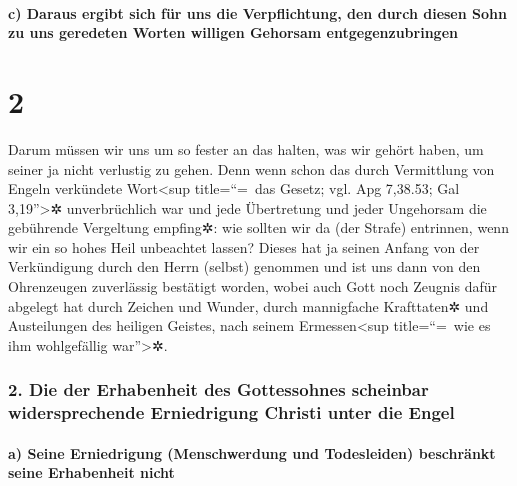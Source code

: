 \hypertarget{c-daraus-ergibt-sich-fuxfcr-uns-die-verpflichtung-den-durch-diesen-sohn-zu-uns-geredeten-worten-willigen-gehorsam-entgegenzubringen}{%
\paragraph{c) Daraus ergibt sich für uns die Verpflichtung, den durch
diesen Sohn zu uns geredeten Worten willigen Gehorsam
entgegenzubringen}\label{c-daraus-ergibt-sich-fuxfcr-uns-die-verpflichtung-den-durch-diesen-sohn-zu-uns-geredeten-worten-willigen-gehorsam-entgegenzubringen}}

\hypertarget{section-1}{%
\section{2}\label{section-1}}

 Darum müssen wir uns um so fester an das halten, was wir
gehört haben, um seiner ja nicht verlustig zu gehen.  Denn
wenn schon das durch Vermittlung von Engeln verkündete Wort\textless sup
title=``=~das Gesetz; vgl. Apg 7,38.53; Gal 3,19''\textgreater✲
unverbrüchlich war und jede Übertretung und jeder Ungehorsam die
gebührende Vergeltung empfing✲:  wie sollten wir da (der
Strafe) entrinnen, wenn wir ein so hohes Heil unbeachtet lassen? Dieses
hat ja seinen Anfang von der Verkündigung durch den Herrn (selbst)
genommen und ist uns dann von den Ohrenzeugen zuverlässig bestätigt
worden,  wobei auch Gott noch Zeugnis dafür abgelegt hat
durch Zeichen und Wunder, durch mannigfache Krafttaten✲ und Austeilungen
des heiligen Geistes, nach seinem Ermessen\textless sup title=``=~wie es
ihm wohlgefällig war''\textgreater✲.

\hypertarget{die-der-erhabenheit-des-gottessohnes-scheinbar-widersprechende-erniedrigung-christi-unter-die-engel}{%
\subsubsection{2. Die der Erhabenheit des Gottessohnes scheinbar
widersprechende Erniedrigung Christi unter die
Engel}\label{die-der-erhabenheit-des-gottessohnes-scheinbar-widersprechende-erniedrigung-christi-unter-die-engel}}

\hypertarget{a-seine-erniedrigung-menschwerdung-und-todesleiden-beschruxe4nkt-seine-erhabenheit-nicht}{%
\paragraph{a) Seine Erniedrigung (Menschwerdung und Todesleiden)
beschränkt seine Erhabenheit
nicht}\label{a-seine-erniedrigung-menschwerdung-und-todesleiden-beschruxe4nkt-seine-erhabenheit-nicht}}


